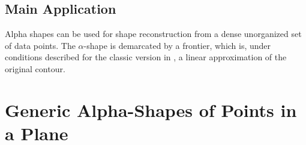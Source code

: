 \subsection*{Main Application}

Alpha shapes can be used for shape reconstruction from a dense unorganized set
of data points. The  $\alpha$-shape is demarcated by a frontier, which is, under
conditions described for the classic version in \cite{bb-srmua-97t}, a linear
approximation of the original contour.


\section{Generic Alpha-Shapes of Points in a Plane \label{I1_SectAlpha_Shape_2}}

